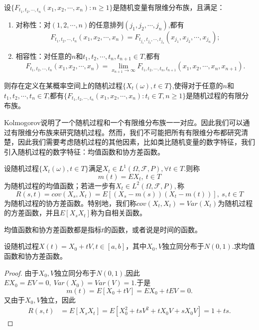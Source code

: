 \documentclass[lang=cn,10pt]{elegantbook}
\begin{document}
	\begin{theorem}[Kolmogorov一致性定理]
		设\(\{F_{t_1,t_2,\cdots,t_n}(x_1,x_2,\cdots,x_n):n\ge 1\}\)是随机变量有限维分布族，且满足：
		\begin{enumerate}
			\item 对称性：对\((1,2,\cdots,n)\)的任意排列\((j_1,j_2,\cdots,j_n)\),都有
			\[F_{t_1,t_2,\cdots,t_n}(x_1,x_2,\cdots,x_n)=F_{t_{j_1},t_{j_2},\cdots,t_{j_n}}(x_{j_1},x_{j_2},\cdots,x_{j_n});\]
			\item 相容性：对任意的\(n\)和\(t_1,t_2,\cdots,t_n,t_{n+1}\in T\),都有
			\[F_{t_1,t_2,\cdots,t_n}(x_1,x_2,\cdots,x_n)=\lim_{x_{n+1}\to \infty}F_{t_1,t_2,\cdots,t_n,t_{n+1}}(x_1,x_2,\cdots,x_n,x_{n+1}).\]
		\end{enumerate}
		则存在定义在某概率空间上的随机过程\(\{X_t(\omega),t\in T\}\),使得对于任意的\(n\)和\(t_1,t_2,\cdots,t_n\in T\),都有\(\{F_{t_1,t_2,\cdots,t_n}(x_1,x_2,\cdots,x_n):t_i\in T,n\ge 1\}\)是随机过程的有限分布族。
	\end{theorem}
	Kolmogorov说明了一个随机过程和一个有限维分布族一一对应。因此我们可以通过有限维分布族来研究随机过程。然而，我们不可能把所有有限维分布都研究清楚，因此我们需要考虑随机过程的其他因素，比如类比随机变量的数字特征，我们引入随机过程的数字特征：均值函数和协方差函数。
	\begin{definition}[均值函数和协方差函数]
		设随机过程\(\{X_t(\omega),t\in T\}\)满足\(X_t\in L^1(\Omega,\mathcal{F},P), \forall t\in T\).则称
		\[m(t)=EX_t,\ t\in T\]
		为随机过程的均值函数；若进一步有\(X_t\in L^2(\Omega,\mathcal{F},P),\)称
		\[R(s,t)=cov(X_s,X_t)=E[(X_s-m(s))(X_t-m(t))],\ s,t\in T\]
		为随机过程的协方差函数。特别地，我们称\(cov(X_t,X_t)=Var(X_t)\)为随机过程的方差函数，并且\(E[X_sX_t]\)称为自相关函数。
	\end{definition}
	\begin{note}
		均值函数和协方差函数都是指标\(t\)的函数，或者说是时间的函数。
	\end{note}
	\begin{example}
		设随机过程\(X(t)=X_0+tV,t\in[a,b]\)，其中\(X_0,V\)独立同分布于\(N(0,1)\).求均值函数和协方差函数。
	\end{example}
	\begin{proof}
		由于\(X_0,V\)独立同分布于\(N(0,1)\),因此\(EX_0=EV=0,\ Var(X_0)=Var(V)=1.\)于是
		\[m(t)=E[X_0+tV]=EX_0+tEV=0.\]
		又由于\(X_0,V\)独立，因此
		\begin{align*}
		R(s,t)&=E[X_sX_t]=E[X_0^2+tsV^2+tX_0V+sX_0V]=1+ts.
		\end{align*}
	\end{proof}
\end{document}
